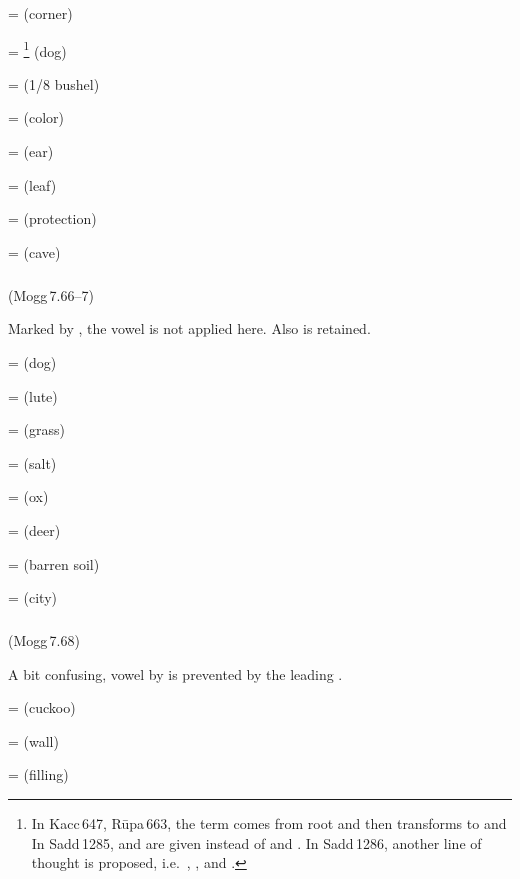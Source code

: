  =  (corner)\par
{} = \footnote{In Kacc\,647, R\=upa\,663, the term comes from root  and then transforms to  and  In Sadd\,1285,  and  are given instead of  and . In Sadd\,1286, another line of thought is proposed, i.e.\ , , and .} (dog)\par
{} =  (1/8 bushel)\par
{} =  (color)\par
{} =  (ear)\par
{} =  (leaf)\par
{} =  (protection)\par
{} =  (cave)\par

\subparagraph*{} (Mogg\,7.66--7)\label{pacckx:dnaka}

Marked by , the vowel  is not applied here. Also  is retained.

 =  (dog)\par
{} =  (lute)\par
{} =  (grass)\par
{} =  (salt)\par
{} =  (ox)\par
{} =  (deer)\par
{} =  (barren soil)\par
{} =  (city)\par

\subparagraph*{} (Mogg\,7.68)\label{pacckx:adna}

A bit confusing, vowel  by  is prevented by the leading .

 =  (cuckoo)\par
{} =  (wall)\par
{} =  (filling)\par


